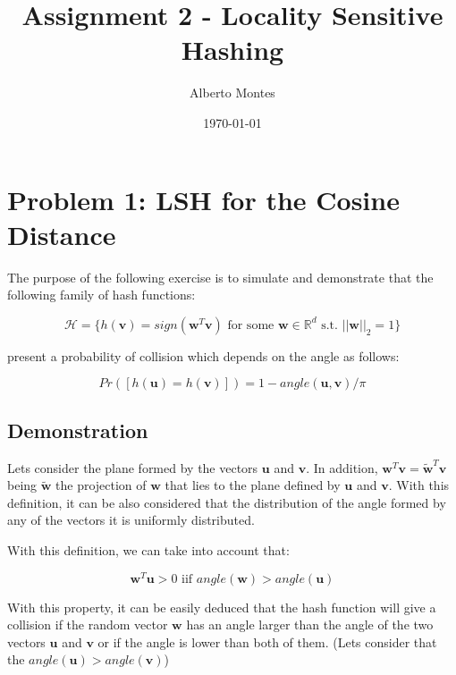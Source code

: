 \documentclass{ethz_report}
\title{Assignment 2 - Locality Sensitive Hashing}
\author{Alberto Montes}
\date{\today}
\begin{document}
\maketitle

\section*{Problem 1: LSH for the Cosine Distance}

The purpose of the following exercise is to simulate and demonstrate that the following family of hash functions:

\begin{equation}
    \mathcal{H} = \{ h(\mathbf{v}) = sign(\mathbf{w}^T \mathbf{v}) \text{ for some } \mathbf{w} \in \mathbb{R}^d \text{ s.t. } ||\mathbf{w}||_2 = 1 \}
\end{equation}

present a probability of collision which depends on the angle as follows:

\begin{equation}
    Pr([h(\mathbf{u})=h(\mathbf{v})]) = 1 - angle(\mathbf{u}, \mathbf{v}) / \pi
    \label{eq:similarity}
\end{equation}

\subsection*{Demonstration}

Lets consider the plane formed by the vectors $\mathbf{u}$ and $\mathbf{v}$. In addition, $\mathbf{w}^T\mathbf{v} = \mathbf{\tilde{w}}^T\mathbf{v}$ being $\mathbf{\tilde{w}}$ the projection of $\mathbf{w}$ that lies to the plane defined by $\mathbf{u}$ and $\mathbf{v}$. With this definition, it can be also considered that the distribution of the angle formed by any of the vectors it is uniformly distributed.

With this definition, we can take into account that:

\begin{equation}
    \mathbf{w}^T\mathbf{u} > 0 \text{ iif } angle(\mathbf{w}) > angle(\mathbf{u})
\end{equation}

With this property, it can be easily deduced that the hash function will give a collision if the random vector $\mathbf{w}$ has an angle larger than the angle of the two vectors $\mathbf{u}$ and $\mathbf{v}$ or if the angle is lower than both of them. (Lets consider that the $angle(\mathbf{u}) > angle(\mathbf{v})$)
\end{document}
